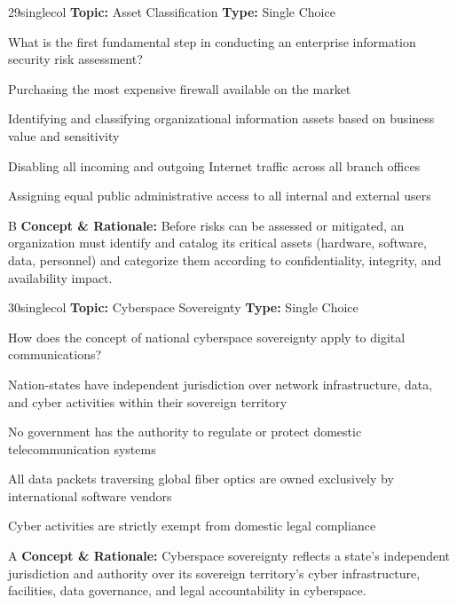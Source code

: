 \begin{qcard}{29}{singlecol}
\textcolor{darkslate!75}{\small\textbf{Topic:} Asset Classification \hfill \textbf{Type:} Single Choice}\vspace{0.4em}\par
What is the first fundamental step in conducting an enterprise information security risk assessment?
\begin{qoptions}
\item Purchasing the most expensive firewall available on the market
\item Identifying and classifying organizational information assets based on business value and sensitivity
\item Disabling all incoming and outgoing Internet traffic across all branch offices
\item Assigning equal public administrative access to all internal and external users
\end{qoptions}
\end{qcard}
\nopagebreak
\begin{explainbox}{B}
\textbf{Concept \& Rationale:} Before risks can be assessed or mitigated, an organization must identify and catalog its critical assets (hardware, software, data, personnel) and categorize them according to confidentiality, integrity, and availability impact.
\end{explainbox}

\begin{qcard}{30}{singlecol}
\textcolor{darkslate!75}{\small\textbf{Topic:} Cyberspace Sovereignty \hfill \textbf{Type:} Single Choice}\vspace{0.4em}\par
How does the concept of national cyberspace sovereignty apply to digital communications?
\begin{qoptions}
\item Nation-states have independent jurisdiction over network infrastructure, data, and cyber activities within their sovereign territory
\item No government has the authority to regulate or protect domestic telecommunication systems
\item All data packets traversing global fiber optics are owned exclusively by international software vendors
\item Cyber activities are strictly exempt from domestic legal compliance
\end{qoptions}
\end{qcard}
\nopagebreak
\begin{explainbox}{A}
\textbf{Concept \& Rationale:} Cyberspace sovereignty reflects a state's independent jurisdiction and authority over its sovereign territory's cyber infrastructure, facilities, data governance, and legal accountability in cyberspace.
\end{explainbox}

